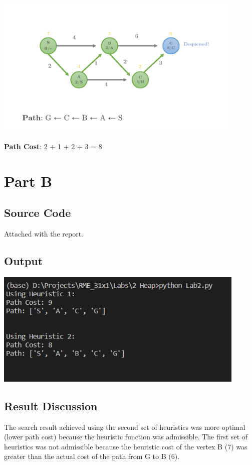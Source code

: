 \documentclass[12pt]{article}
\begin{document}
\begin{center}
  \includegraphics[width=0.9\textwidth]{heuristic2_Page8.png}
\end{center}

\noindent
\textbf{Path Cost}: 2 + 1 + 2 + 3 = 8

\pagebreak
\section*{Part B}

\subsection*{Source Code}
Attached with the report.

\subsection*{Output}
\begin{center}
  \includegraphics[width=0.9\textwidth]{Output.png}
\end{center}

\subsection*{Result Discussion}
The search result achieved using the second set of heuristics was more optimal (lower path cost) because the heuristic function was admissible. The first set of heuristics was not admissible because the heuristic cost of the vertex B (7) was greater than the actual cost of the path from G to B (6).
\end{document}
